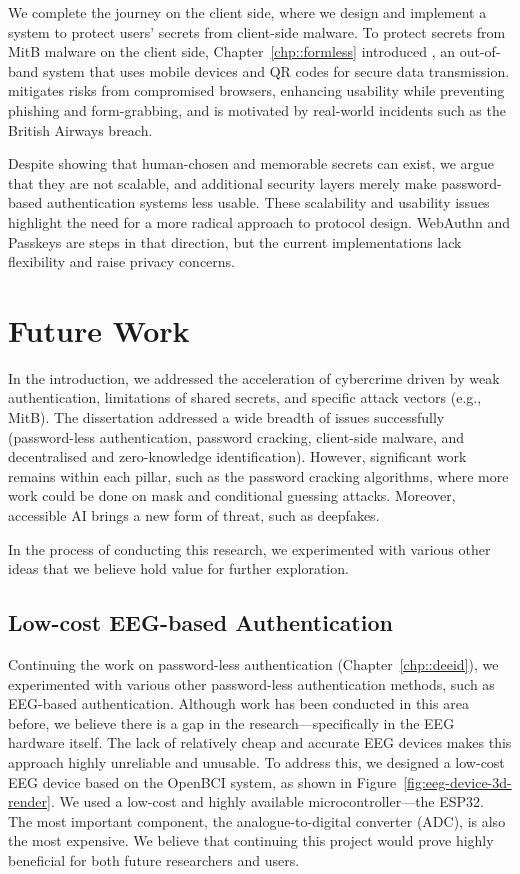 We complete the journey on the client side, where we design and implement a system to protect users’ secrets from client-side malware. To protect secrets from MitB malware on the client side, Chapter~\ref{chp::formless} introduced \formless, an out-of-band system that uses mobile devices and QR codes for secure data transmission. \formless mitigates risks from compromised browsers, enhancing usability while preventing phishing and form-grabbing, and is motivated by real-world incidents such as the British Airways breach.

Despite showing that human-chosen and memorable secrets can exist, we argue that they are not scalable, and additional security layers merely make password-based authentication systems less usable. These scalability and usability issues highlight the need for a more radical approach to protocol design. WebAuthn and Passkeys are steps in that direction, but the current implementations lack flexibility and raise privacy concerns.

\section{Future Work}

In the introduction, we addressed the acceleration of cybercrime driven by weak authentication, limitations of shared secrets, and specific attack vectors (e.g., MitB). The dissertation addressed a wide breadth of issues successfully (password-less authentication, password cracking, client-side malware, and decentralised and zero-knowledge identification). However, significant work remains within each pillar, such as the password cracking algorithms, where more work could be done on mask and conditional guessing attacks. Moreover, accessible AI brings a new form of threat, such as deepfakes.

In the process of conducting this research, we experimented with various other ideas that we believe hold value for further exploration.

\subsection{Low-cost EEG-based Authentication}
Continuing the work on password-less authentication (Chapter~\ref{chp::deeid}), we experimented with various other password-less authentication methods, such as EEG-based authentication. Although work has been conducted in this area before, we believe there is a gap in the research---specifically in the EEG hardware itself. The lack of relatively cheap and accurate EEG devices makes this approach highly unreliable and unusable. To address this, we designed a low-cost EEG device based on the OpenBCI system, as shown in Figure~\ref{fig:eeg-device-3d-render}. We used a low-cost and highly available microcontroller---the ESP32. The most important component, the analogue-to-digital converter (ADC), is also the most expensive. We believe that continuing this project would prove highly beneficial for both future researchers and users.


